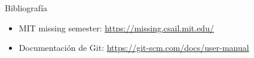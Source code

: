 \begin{frame}{Bibliografía}
\begin{itemize}
    \item MIT missing semester: \href{https://missing.csail.mit.edu/}{https://missing.csail.mit.edu/} 
    \item Documentación de Git: \href{https://git-scm.com/docs/user-manual}{https://git-scm.com/docs/user-manual}
\end{itemize}
\end{frame}
